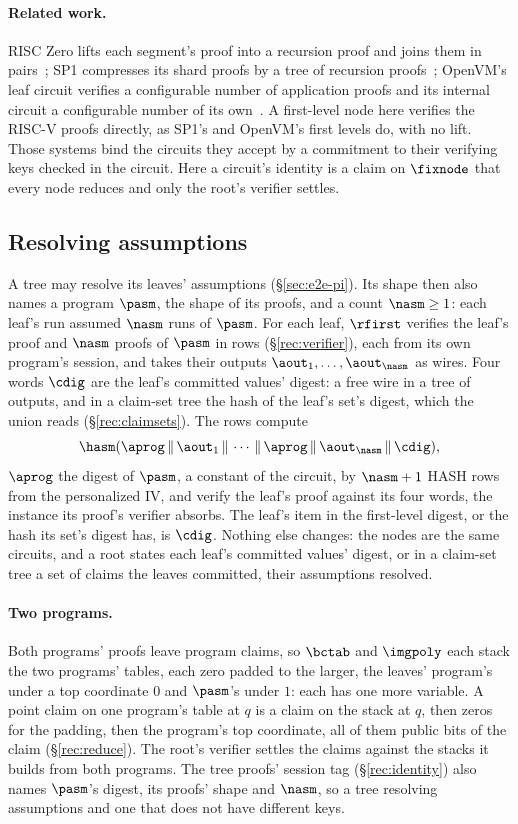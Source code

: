 \paragraph{Related work.} RISC Zero lifts each segment's proof into a recursion proof and joins them in pairs~\cite{BG23}; SP1 compresses its shard proofs by a tree of recursion proofs~\cite{SP1}; OpenVM's leaf circuit verifies a configurable number of application proofs and its internal circuit a configurable number of its own~\cite{OpenVM}. A first-level node here verifies the RISC-V proofs directly, as SP1's and OpenVM's first levels do, with no lift. Those systems bind the circuits they accept by a commitment to their verifying keys checked in the circuit. Here a circuit's identity is a claim on $\fixnode$ that every node reduces and only the root's verifier settles.

\subsection{Resolving assumptions}\label{rec:assume}

A tree may resolve its leaves' assumptions (\S\ref{sec:e2e-pi}). Its shape then also names a program $\pasm$, the shape of its proofs, and a count $\nasm\ge1$: each leaf's run assumed $\nasm$ runs of $\pasm$. For each leaf, $\rfirst$ verifies the leaf's proof and $\nasm$ proofs of $\pasm$ in rows (\S\ref{rec:verifier}), each from its own program's session, and takes their outputs $\aout_1,\dots,\aout_{\nasm}$ as wires. Four words $\cdig$ are the leaf's committed values' digest: a free wire in a tree of outputs, and in a claim-set tree the hash of the leaf's set's digest, which the union reads (\S\ref{rec:claimsets}). The rows compute
\[
  \hasm(\aprog\,\|\,\aout_1\,\|\,\cdots\,\|\,\aprog\,\|\,\aout_{\nasm}\,\|\,\cdig),
\]
$\aprog$ the digest of $\pasm$, a constant of the circuit, by $\nasm+1$ \textsf{HASH} rows from the personalized IV, and verify the leaf's proof against its four words, the instance its proof's verifier absorbs. The leaf's item in the first-level digest, or the hash its set's digest has, is $\cdig$. Nothing else changes: the nodes are the same circuits, and a root states each leaf's committed values' digest, or in a claim-set tree a set of claims the leaves committed, their assumptions resolved.

\paragraph{Two programs.} Both programs' proofs leave program claims, so $\bctab$ and $\imgpoly$ each stack the two programs' tables, each zero padded to the larger, the leaves' program's under a top coordinate $0$ and $\pasm$'s under $1$: each has one more variable. A point claim on one program's table at $q$ is a claim on the stack at $q$, then zeros for the padding, then the program's top coordinate, all of them public bits of the claim (\S\ref{rec:reduce}). The root's verifier settles the claims against the stacks it builds from both programs. The tree proofs' session tag (\S\ref{rec:identity}) also names $\pasm$'s digest, its proofs' shape and $\nasm$, so a tree resolving assumptions and one that does not have different keys.

